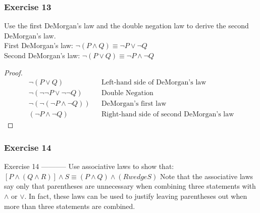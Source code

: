 


\subsubsection{Exercise 13}
    \question Use the first DeMorgan’s law and the double negation law to derive the second DeMorgan’s law. \\
    First DeMorgan's law: $\neg (P \wedge Q) \equiv \neg P \vee \neg Q$ \\
    Second DeMorgan's law: $\neg (P \vee Q) \equiv \neg P \wedge \neg Q$
    \begin{solution}
    \begin{proof}
            \begin{align*}
                \neg(P \vee Q) && \text{Left-hand side of DeMorgan's law} \\
                \neg(\neg\neg P \vee \neg\neg Q) && \text{Double Negation} \\
                \neg(\neg(\neg P \wedge \neg Q)) && \text{DeMorgan's first law} \\
                (\neg P \wedge \neg Q) && \text{Right-hand side of second DeMorgan's law}
            \end{align*}
        \end{proof}
    \end{solution}

\subsubsection{Exercise 14}
Exercise 14
-----------
\question Use associative laws to show that:
    $[P \wedge (Q \wedge R)] \wedge S \equiv (P \wedge Q) \wedge (R wedge S)$
    Note that the associative laws say only that parentheses are unnecessary when combining three statements with $\wedge$ or $\vee$. In fact, these laws can be used to justify leaving parentheses out when more than three statements are combined. 

